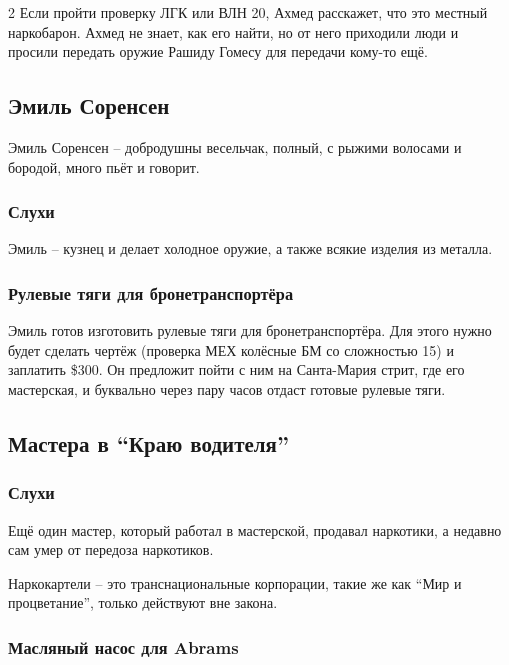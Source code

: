 \documentclass[twoside]{article}
\begin{document}
\begin{multicols}{2}
Если пройти проверку ЛГК или ВЛН 20, Ахмед расскажет, что это местный
наркобарон. Ахмед не знает, как его найти, но от него приходили люди и
просили передать оружие Рашиду Гомесу для передачи кому-то ещё.

\subsection{Эмиль Соренсен}\label{emil-sorensen}

Эмиль Соренсен -- добродушны весельчак, полный, с рыжими волосами и
бородой, много пьёт и говорит.

\subsubsection{Слухи}\label{rumors-sorensen}

Эмиль -- кузнец и делает холодное оружие, а также всякие изделия из
металла.

\subsubsection{Рулевые тяги для бронетранспортёра}\label{apc-steering-tie-rods}

Эмиль готов изготовить рулевые тяги для бронетранспортёра. Для этого
нужно будет сделать чертёж (проверка МЕХ колёсные БМ со сложностью 15) и
заплатить \$300. Он предложит пойти с ним на Санта-Мария стрит, где его
мастерская, и буквально через пару часов отдаст готовые рулевые тяги.

\subsection{Мастера в \enquote{Краю водителя}}\label{mechanics-drivers-edge}

\subsubsection{Слухи}\label{rumors-mechanics}

Ещё один мастер, который работал в мастерской, продавал наркотики, а
недавно сам умер от передоза наркотиков.

Наркокартели -- это транснациональные корпорации, такие же как \enquote{Мир и
процветание}, только действуют вне закона.

\subsubsection{Масляный насос для Abrams}\label{oil-pump-abrams}


\end{multicols}
\end{document}
